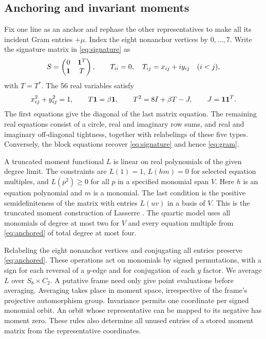 \subsection{Anchoring and invariant moments}

Fix one line as an anchor and rephase the other representatives to make all its incident Gram entries $+\mu$. Index the eight nonanchor vertices by $0,\ldots,7$. Write the signature matrix in \eqref{eq:signature} as
\[
 S=\begin{pmatrix}0&\mathbf 1^T\\\mathbf 1&T\end{pmatrix},\qquad
 T_{ii}=0,\quad T_{ij}=x_{ij}+i y_{ij}\quad(i<j),
\]
with $T=T^*$. The 56 real variables satisfy
\begin{equation}\label{eq:anchored}
 x_{ij}^2+y_{ij}^2=1,\qquad T\mathbf 1=\beta\mathbf 1,\qquad
 T^2=8I+\beta T-J,\qquad J=\mathbf 1\mathbf 1^T.
\end{equation}
The first equations give the diagonal of the last matrix equation. The remaining real equations consist of a circle, real and imaginary row sums, and real and imaginary off-diagonal tightness, together with relabelings of these five types. Conversely, the block equations recover \eqref{eq:signature} and hence \eqref{eq:gram}.

A truncated moment functional $L$ is linear on real polynomials of the given degree limit. The constraints are $L(1)=1$, $L(hm)=0$ for selected equation multiples, and $L(p^2)\ge0$ for all $p$ in a specified monomial span $V$. Here $h$ is an equation polynomial and $m$ is a monomial. The last condition is the positive semidefiniteness of the matrix with entries $L(uv)$ in a basis of $V$. This is the truncated moment construction of Lasserre \cite{lasserre}. The quartic model uses all monomials of degree at most two for $V$ and every equation multiple from \eqref{eq:anchored} of total degree at most four.

Relabeling the eight nonanchor vertices and conjugating all entries preserve \eqref{eq:anchored}. These operations act on monomials by signed permutations, with a sign for each reversal of a $y$-edge and for conjugation of each $y$ factor. We average $L$ over $S_8\times C_2$. A putative frame need only give point evaluations before averaging. Averaging takes place in moment space, irrespective of the frame's projective automorphism group. Invariance permits one coordinate per signed monomial orbit. An orbit whose representative can be mapped to its negative has moment zero. These rules also determine all unused entries of a stored moment matrix from the representative coordinates.

